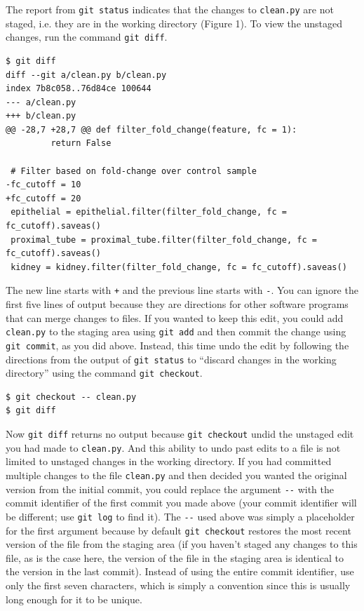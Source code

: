 \documentclass[10pt]{article}
\begin{document}
The report from \verb|git status| indicates that the changes to \verb|clean.py| are not staged, i.e. they are in the working directory (Figure 1).
To view the unstaged changes, run the command \verb|git diff|.

\begin{verbatim}
$ git diff
diff --git a/clean.py b/clean.py
index 7b8c058..76d84ce 100644
--- a/clean.py
+++ b/clean.py
@@ -28,7 +28,7 @@ def filter_fold_change(feature, fc = 1):
         return False

 # Filter based on fold-change over control sample
-fc_cutoff = 10
+fc_cutoff = 20
 epithelial = epithelial.filter(filter_fold_change, fc = fc_cutoff).saveas()
 proximal_tube = proximal_tube.filter(filter_fold_change, fc = fc_cutoff).saveas()
 kidney = kidney.filter(filter_fold_change, fc = fc_cutoff).saveas()
\end{verbatim}

The new line starts with \verb|+| and the previous line starts with \verb|-|.
You can ignore the first five lines of output because they are directions for other software programs that can merge changes to files.
If you wanted to keep this edit, you could add \verb|clean.py| to the staging area using \verb|git add| and then commit the change using \verb|git commit|, as you did above.
Instead, this time undo the edit by following the directions from the output of \verb|git status| to ``discard changes in the working directory'' using the command \verb|git checkout|.

\begin{verbatim}
$ git checkout -- clean.py
$ git diff
\end{verbatim}

Now \verb|git diff| returns no output because \verb|git checkout| undid the unstaged edit you had made to \verb|clean.py|.
And this ability to undo past edits to a file is not limited to unstaged changes in the working directory.
If you had committed multiple changes to the file \verb|clean.py| and then decided you wanted the original version from the initial commit, you could replace the argument \verb|--| with the commit identifier of the first commit you made above (your commit identifier will be different; use \verb|git log| to find it).
The \verb|--| used above was simply a placeholder for the first argument because by default \verb|git checkout| restores the most recent version of the file from the staging area (if you haven't staged any changes to this file, as is the case here, the version of the file in the staging area is identical to the version in the last commit).
Instead of using the entire commit identifier, use only the first seven characters, which is simply a convention since this is usually long enough for it to be unique.
\end{document}
